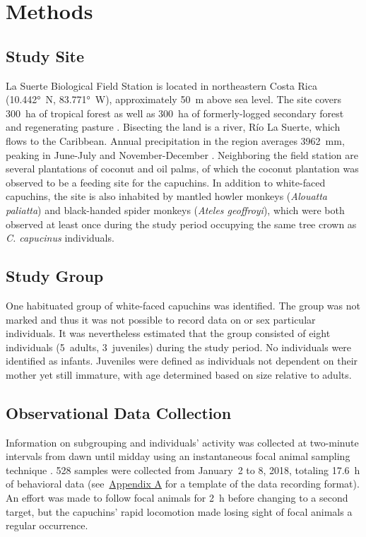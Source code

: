 \documentclass{../../../coursework}
\begin{document}
\section{Methods}

\subsection{Study Site}

La Suerte Biological Field Station is located in northeastern Costa Rica
(10.442°~N, 83.771°~W), approximately \SI{50}{\metre} above sea level. The
site covers 300~ha of tropical forest as well as \SI{300}{\hectare} of
formerly-logged secondary forest and regenerating pasture
\parencite{Mallott2017}. Bisecting the land is a river, Río La Suerte, which
flows to the Caribbean. Annual precipitation in the region averages
\SI{3962}{\milli\metre}, peaking in June-July and November-December
\parencite{Sanford1994}. Neighboring the field station are several plantations
of coconut and oil palms, of which the coconut plantation was observed to be a
feeding site for the capuchins. In addition to white-faced capuchins, the site
is also inhabited by mantled howler monkeys (\emph{Alouatta paliatta}) and
black-handed spider monkeys (\emph{Ateles geoffroyi}), which were both
observed at least once during the study period occupying the same tree crown
as \emph{C. capucinus} individuals.

\subsection{Study Group}

One habituated group of white-faced capuchins was identified. The group was
not marked and thus it was not possible to record data on or sex particular
individuals. It was nevertheless estimated that the group consisted of eight
individuals (5~adults, 3~juveniles) during the study period. No individuals
were identified as infants. Juveniles were defined as individuals not
dependent on their mother yet still immature, with age determined based on
size relative to adults.

\subsection{Observational Data Collection}

Information on subgrouping and individuals' activity was collected at
two-minute intervals from dawn until midday using an instantaneous focal
animal sampling technique \parencite{Altmann1974}. 528 samples were collected
from January~2 to 8, 2018, totaling \SI{17.6}{\hour} of behavioral data
(see~\hyperref[sec:appendix_a]{Appendix A} for a template of the data
recording format). An effort was made to follow focal animals for
\SI{2}{\hour} before changing to a second target, but the capuchins' rapid
locomotion made losing sight of focal animals a regular occurrence.
\end{document}
